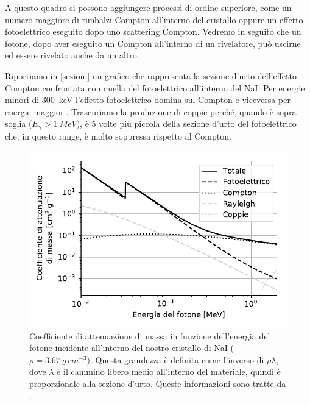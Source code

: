 A questo quadro si possono aggiungere processi di ordine superiore, come un numero maggiore di rimbalzi Compton all'interno del cristallo oppure un effetto fotoelettrico eseguito dopo uno scattering Compton.
Vedremo in seguito che un fotone, dopo aver eseguito un Compton all'interno di un rivelatore, può uscirne ed essere rivelato anche da un altro.

Riportiamo in \autoref{sezioni} un grafico che rappresenta la sezione d'urto dell'effetto Compton confrontata con quella del fotoelettrico all'interno del NaI. Per energie minori di \SI{300}{keV} l'effetto fotoelettrico domina sul Compton e viceversa per energie maggiori.
Trascuriamo la produzione di coppie perché, quando è sopra soglia ($E_{\gamma}>\SI{1}{MeV}$), è 5 volte più piccola della sezione d'urto del fotoelettrico che, in questo range, è molto soppressa rispetto al Compton.

\begin{figure}[h]
\centering
\includegraphics[width=25 em]{immagini/cross}
\caption{\label{fig:cross}
Coefficiente di attenuazione di massa in funzione dell'energia del fotone incidente all'interno del nostro cristallo di NaI ($\rho=\SI{3.67}{g\,cm^{-3}})$. Questa grandezza è definita come l'inverso di $\rho\lambda$, dove $\lambda$ è il cammino libero medio all'interno del materiale, quindi è proporzionale alla sezione d'urto. Queste informazioni sono tratte da \cite{cross}.}
\label{sezioni}
\end{figure}
